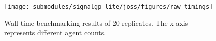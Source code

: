 \begin{figure}[h]

\centering
\texttt{[image: submodules/signalgp-lite/joss/figures/raw-timings]}

\caption{%
Wall time benchmarking results of 20 replicates.
The x-axis represents different agent counts.
} \label{fig:max-fitness-sd}

\end{figure}
